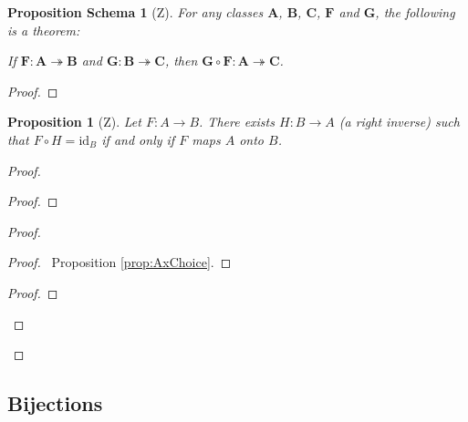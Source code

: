 \documentclass{book}
\let\qed\relax
\newtheorem{prop}[ax]{Proposition}
\newtheorem{props}[ax]{Proposition Schema}
\theoremstyle{definition}
\newcommand{\id}[1]{\ensuremath{\mathrm{id}_{#1}}}
\begin{document}
\begin{props}[Z]
\label{prop:compsurj}
For any classes $\mathbf{A}$, $\mathbf{B}$, $\mathbf{C}$, $\mathbf{F}$ and $\mathbf{G}$, the following is a theorem:

If $\mathbf{F} : \mathbf{A} \twoheadrightarrow \mathbf{B}$ and $\mathbf{G} : \mathbf{B} \twoheadrightarrow \mathbf{C}$, then $\mathbf{G} \circ \mathbf{F} : \mathbf{A} \twoheadrightarrow \mathbf{C}$.
\end{props}

\begin{proof}
\pf
{}
\qed
\end{proof}

\begin{prop}[Z]
Let $F : A \rightarrow B$. There exists $H : B \rightarrow A$ (a \emph{right inverse}) such that $F \circ H = \id{B}$ if and only if $F$ maps $A$ onto $B$.
\end{prop}

\begin{proof}
\pf
{}
\begin{proof}
\end{proof}
\begin{proof}
	\begin{proof}
		\pf\ Proposition \ref{prop:AxChoice}.
	\end{proof}
	\step{d}{$F \circ H = \id{B}$}
	\begin{proof}
	\end{proof}
\end{proof}
\qed
\end{proof}

\subsection{Bijections}
\end{document}
